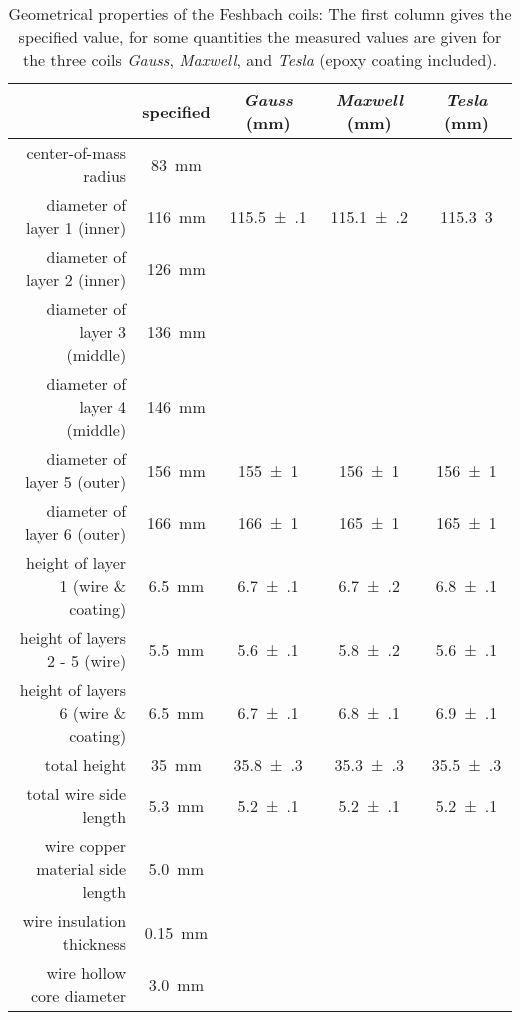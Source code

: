 \begin{table}
    \centering
    \begin{tabular}{rcccc}
        \toprule
        & \textbf{specified} & \textbf{\textit{Gauss}} (\si[]{\milli\meter}) & \textbf{\textit{Maxwell}} (\si[]{\milli\meter}) & \textbf{\textit{Tesla}} (\si[]{\milli\meter}) \\
        \toprule
        center-of-mass radius & \SI{83}{\milli\meter} &&& \\
        diameter of layer 1 (inner) & \SI{116}{\milli\meter} & \SI{115.5(1)}{}& \SI{115.1(2)}{} & \SI{115.3}{3} \\
        diameter of layer 2 (inner) & \SI{126}{\milli\meter} & && \\
        diameter of layer 3 (middle) & \SI{136}{\milli\meter} &&& \\
        diameter of layer 4 (middle) & \SI{146}{\milli\meter} &&& \\
        diameter of layer 5 (outer) & \SI{156}{\milli\meter} & \SI{155(1)}{}& \SI{156(1)}{} & \SI{156(1)}{} \\
        diameter of layer 6 (outer) & \SI{166}{\milli\meter} & \SI{166(1)}{} & \SI{165(1)}{} & \SI{165(1)}{} \\
        \midrule
        height of layer 1 (wire \& coating) & \SI{6.5}{\milli\meter} & \SI{6.7(1)}{} & \SI{6.7(2)}{} & \SI{6.8(1)}{} \\
        height of layers 2 - 5 (wire) & \SI{5.5}{\milli\meter} & \SI{5.6(1)}{} & \SI{5.8(2)}{} & \SI{5.6(1)}{} \\
        height of layers 6 (wire \& coating) & \SI{6.5}{\milli\meter} & \SI{6.7(1)}{} & \SI{6.8(1)}{} & \SI{6.9(1)}{}\\
        total height & \SI{35}{\milli\meter} & \SI{35.8(3)}{} & \SI{35.3(3)}{} & \SI{35.5(3)}{}\\
        \midrule
        total wire side length &  \SI{5.3}{\milli\meter} & \SI{5.2(1)}{} & \SI{5.2(1)}{} & \SI{5.2(1)}{}\\
        wire copper material side length & \SI{5.0}{\milli\meter} &&& \\
        wire insulation thickness & \SI{0.15}{\milli\meter} &&& \\
        wire hollow core diameter & \SI{3.0}{\milli\meter} &&& \\
        \bottomrule
    \end{tabular}
    \caption{Geometrical properties of the Feshbach coils: The first column gives the specified value, for some quantities the measured values are given for the three coils \textit{Gauss}, \textit{Maxwell}, and \textit{Tesla} (epoxy coating included).}
    \label{tab:coil_geometrical_properties}
\end{table}

